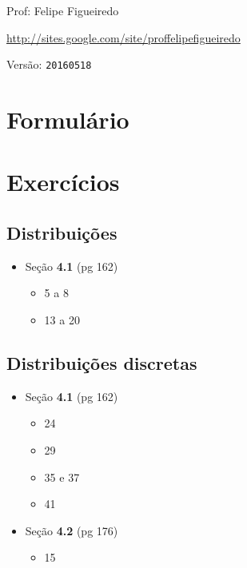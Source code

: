 \documentclass[a4paper]{article}
\begin{document}
\parbox[c]{.825\textwidth}{\raggedright%
{Prof: Felipe Figueiredo\par}
{\url{http://sites.google.com/site/proffelipefigueiredo}\par}
}

Versão: \verb|20160518|



\section{Formulário}

\section{Exercícios}

\subsection{Distribuições}
\begin{itemize}
\item Seção {\bf 4.1} (pg 162)
  \begin{itemize}
\item 5 a 8
\item 13 a 20
  \end{itemize}

\end{itemize}
\subsection{Distribuições discretas}

\begin{itemize}
\item Seção {\bf 4.1} (pg 162)
  \begin{itemize}
  \item 24
  \item 29
  \item 35 e 37
  \item 41
  \end{itemize}
\item Seção {\bf 4.2} (pg 176)
  \begin{itemize}
  \item 15 
  \end{itemize}
\end{itemize}
\end{document}
